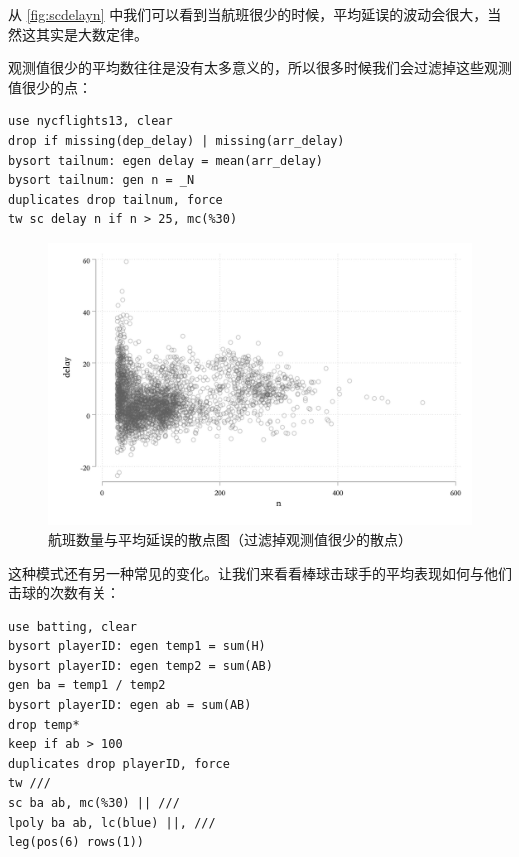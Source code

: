 从 \ref{fig:scdelayn} 中我们可以看到当航班很少的时候，平均延误的波动会很大，当然这其实是大数定律。

观测值很少的平均数往往是没有太多意义的，所以很多时候我们会过滤掉这些观测值很少的点：

\begin{lstlisting}
use nycflights13, clear
drop if missing(dep_delay) | missing(arr_delay)
bysort tailnum: egen delay = mean(arr_delay)
bysort tailnum: gen n = _N
duplicates drop tailnum, force
tw sc delay n if n > 25, mc(%30)
\end{lstlisting}

\begin{figure}[htbp]
  \centering
  \includegraphics[width=\textwidth]{assets/scdelayn2.png}
  \caption{航班数量与平均延误的散点图（过滤掉观测值很少的散点）}
  \label{fig:scdelayn2}
\end{figure}

这种模式还有另一种常见的变化。让我们来看看棒球击球手的平均表现如何与他们击球的次数有关：

\begin{lstlisting}
use batting, clear
bysort playerID: egen temp1 = sum(H)
bysort playerID: egen temp2 = sum(AB)
gen ba = temp1 / temp2
bysort playerID: egen ab = sum(AB)
drop temp*
keep if ab > 100
duplicates drop playerID, force
tw ///
sc ba ab, mc(%30) || ///
lpoly ba ab, lc(blue) ||, ///
leg(pos(6) rows(1))
\end{lstlisting}

